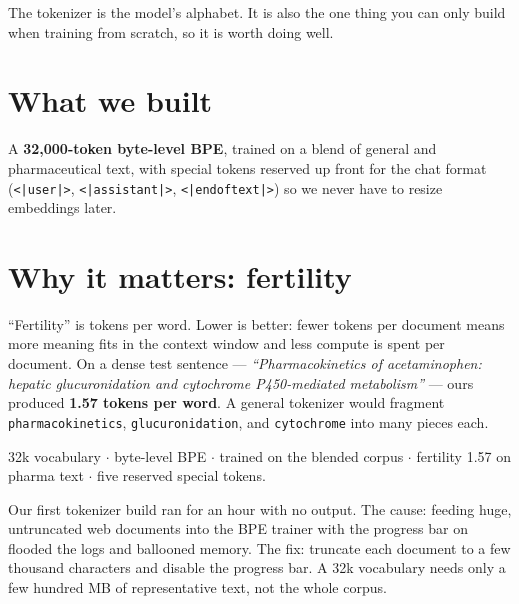 The tokenizer is the model's alphabet. It is also the one thing you can only build when training from
scratch, so it is worth doing well.

\section{What we built}
A \textbf{32{,}000-token byte-level BPE}, trained on a blend of general and pharmaceutical text, with special
tokens reserved up front for the chat format (\texttt{<|user|>}, \texttt{<|assistant|>}, \texttt{<|endoftext|>})
so we never have to resize embeddings later.

\section{Why it matters: fertility}
``Fertility'' is tokens per word. Lower is better: fewer tokens per document means more meaning fits in the
context window and less compute is spent per document. On a dense test sentence ---
\emph{``Pharmacokinetics of acetaminophen: hepatic glucuronidation and cytochrome P450-mediated
metabolism''} --- ours produced \textbf{1.57 tokens per word}. A general tokenizer would fragment
\texttt{pharmacokinetics}, \texttt{glucuronidation}, and \texttt{cytochrome} into many pieces each.


\begin{numbers}
32k vocabulary $\cdot$ byte-level BPE $\cdot$ trained on the blended corpus $\cdot$ fertility 1.57 on pharma
text $\cdot$ five reserved special tokens.
\end{numbers}

\begin{gotcha}
Our first tokenizer build ran for an hour with no output. The cause: feeding huge, untruncated web documents
into the BPE trainer with the progress bar on flooded the logs and ballooned memory. The fix: truncate each
document to a few thousand characters and disable the progress bar. A 32k vocabulary needs only a few hundred
MB of representative text, not the whole corpus.
\end{gotcha}

